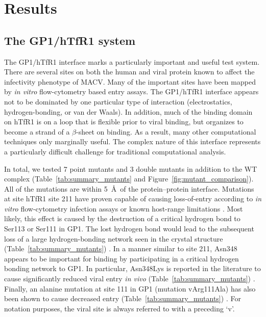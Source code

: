 \documentclass[12pt]{article}
\begin{document}
\section{Results}

\subsection{The GP1/hTfR1 system}
The GP1/hTfR1 interface marks a particularly important and useful test system. There are several sites on both the human and viral protein known to affect the infectivity phenotype of MACV. Many of the important sites have been mapped by \textit{in vitro} flow-cytometry based entry assays. The GP1/hTfR1 interface appears not to be dominated by one particular type of interaction (electrostatics, hydrogen-bonding, or van der Waals). In addition, much of the binding domain on hTfR1 is on a loop that is flexible prior to viral binding, but organizes to become a strand of a $\beta$-sheet on binding. As a result,  many other computational techniques \citep{Grant2011,Kortemme2004} only marginally useful. The complex nature of this interface represents a particularly difficult challenge for traditional computational analysis. 

In total, we tested 7 point mutants and 3 double mutants in addition to the WT complex (Table~\ref{tab:summary_mutants} and Figure~\ref{fig:mutant_comparison}). All of the mutations are within 5~\AA\ of the protein--protein interface. Mutations at site hTfR1 site 211 have proven capable of causing loss-of-entry according to \textit{in vitro} flow-cytometry infection assays or known host-range limitations \citep{Rad2008,Rad20111,Rad20112}. Most likely, this effect is caused by the destruction of a critical hydrogen bond to Ser113 or Ser111 in GP1. The lost hydrogen bond would lead to the subsequent loss of a large hydrogen-bonding network seen in the crystal structure (Table~\ref{tab:summary_mutants}) \citep{Abraham2010}. In a manner similar to site 211, Asn348 appears to be important for binding by participating in a critical hydrogen bonding network \citep{Rad2008,Abraham2010} to GP1. In particular, Asn348Lys is reported in the literature to cause significantly reduced viral entry \textit{in vivo} (Table~\ref{tab:summary_mutants}) \citep{Rad2008,Abraham2010}. Finally, an alanine mutation at site 111 in GP1 (mutation vArg111Ala) has also been shown to cause decreased entry (Table~\ref{tab:summary_mutants}) \citep{Rad20112}. For notation purposes, the viral site is always referred to with a preceding `v'.  
\end{document}
